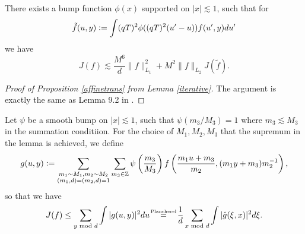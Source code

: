 \begin{lemma} \label{iterative}
    There exists a bump function $\phi(x)$ supported on $|x|\lesssim 1$, such that for \[
    \tilde{f}(u,y) \mathrel{\mathop:}= \int (qT)^2 \phi((qT)^2(u'-u)) f(u',y) du'
    \]
    we have \[
    J(f)\lesssim \frac{M^6}{d}\|f\|_{L_1}^2 + M^2 \|f\|_{L_2} J(\tilde{f}).
    \]
\end{lemma}

\begin{proof}[Proof of Proposition \ref{affinetrans} from Lemma \ref{iterative}]
    The argument is exactly the same as Lemma 9.2 in \cite{GM2024}.
\end{proof}
Let $\psi$ be a smooth bump on $|x|\lesssim 1$, such that $\psi(m_3/M_3)=1$ where $m_3\lesssim M_3$ in the summation conditiion. 
For the choice of $M_1,M_2,M_3$ that the supremum in the lemma is achieved, we define \[
    g(u,y)\mathrel{\mathop:}=\sum_{\substack{m_1\sim M_1,m_2\sim M_2\\ (m_1,d)=(m_2,d)=1}} \sum_{m_3\in \mathbb{Z}} \psi\left(\frac{m_3}{M_3}\right)f\left(\frac{m_1 u+m_3}{m_2} , (m_1 y+m_3)m_2^{-1}\right),
\]so that we have \[
J(f)\leq \sum_{y\mod d} \int |g(u,y)|^2 du \quad \stackeq{Plancherel} \quad  \frac{1}{d}\sum_{x\mod d} \int |\hat{g}(\xi,x)|^2 d\xi.
\]
